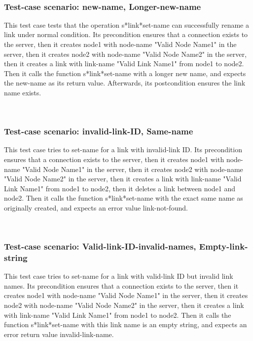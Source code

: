 \
\subsubsection {Test-case scenario: new-name, Longer-new-name}


This test case tests that the operation s*link*set-name can successfully rename a link under normal condition.
Its precondition ensures that a connection exists to the server, then it creates node1 with node-name "Valid Node Name1" in the server, then it creates node2 with node-name  "Valid Node Name2" in the server, then it creates a link with link-name "Valid Link Name1" from node1 to node2.
Then it calls the function s*link*set-name  with a longer new name, and expects the new-name as its return value.
Afterwards, its postcondition ensures the link name exists.




\
\subsubsection {Test-case scenario: invalid-link-ID, Same-name}


This test case tries to set-name for a link with invalid-link ID.
Its precondition ensures that a connection exists to the server, then it creates node1 with node-name "Valid Node Name1" in the server, then it creates node2 with node-name  "Valid Node Name2" in the server, then it creates a link with link-name "Valid Link Name1" from node1 to node2, then it deletes a link between node1 and node2.
Then it calls the function s*link*set-name  with the exact same name as originally created, and expects an error value link-not-found.





\
\subsubsection {Test-case scenario: Valid-link-ID-invalid-names, Empty-link-string}


This test case tries to set-name for a link with valid-link ID but invalid link names.
Its precondition ensures that a connection exists to the server, then it creates node1 with node-name "Valid Node Name1" in the server, then it creates node2 with node-name  "Valid Node Name2" in the server, then it creates a link with link-name "Valid Link Name1" from node1 to node2.
Then it calls the function s*link*set-name  with this link name is an empty string, and expects an error return value invalid-link-name.





